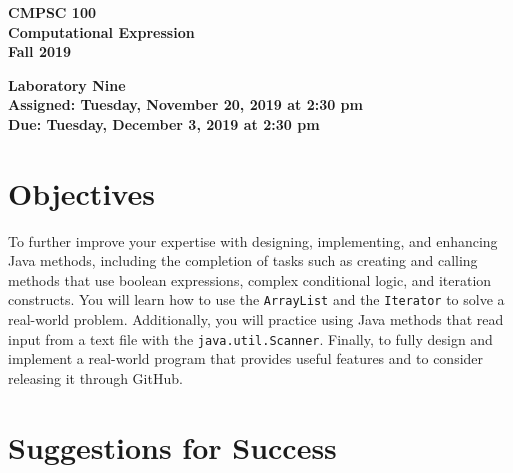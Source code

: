 \documentclass[11pt]{article}
\newcommand{\assignmentduedate}{December 3}
\newcommand{\assignmentassignedate}{November 20}
\newcommand{\assignmentnumber}{Nine}
\newcommand{\labyear}{2019}
\newcommand{\labday}{Tuesday}
\newcommand{\labdueday}{Tuesday}
\newcommand{\labtime}{2:30 pm}
\newcommand{\assigneddate}{Assigned: \labday, \assignmentassignedate, \labyear{} at \labtime{}}
\newcommand{\duedate}{Due: \labdueday, \assignmentduedate, \labyear{} at \labtime{}}
\newcommand{\program}[1]{\lstinline{#1}}
\newcommand{\labtitle}[1]
{
  \begin{center}
    \begin{center}
      \bf
      CMPSC 100\\Computational Expression\\
      Fall 2019\\
      \medskip
    \end{center}
    \bf
    #1
  \end{center}
}
\begin{document}
\thispagestyle{empty}

\labtitle{Laboratory \assignmentnumber{} \\ \assigneddate{} \\ \duedate{}}

\section*{Objectives}

To further improve your expertise with designing, implementing, and enhancing
Java methods, including the completion of tasks such as creating and calling
methods that use boolean expressions, complex conditional logic, and iteration
constructs. You will learn how to use the \program{ArrayList} and the
\program{Iterator} to solve a real-world problem. Additionally, you will
practice using Java methods that read input from a text file with the
\program{java.util.Scanner}. Finally, to fully design and implement a real-world
program that provides useful features and to consider releasing it through
GitHub.



\section*{Suggestions for Success}
\end{document}
